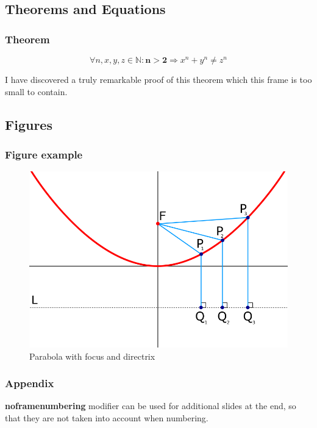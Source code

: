 \documentclass[aspectratio=169]{beamer}
\begin{document}
\subsection{Theorems and Equations}


\begin{frame}
\frametitle{Theorem}
\begin{theorem}
\begin{equation}
    \forall n, x, y, z \in \mathbb{N}: \mathbf{n > 2} \Rightarrow x^n + y^n \neq z^n
\end{equation}
\end{theorem}
I have discovered a truly remarkable proof of this theorem which this frame is too small to contain.
\end{frame}


\subsection{Figures}

\begin{frame}
\frametitle{Figure example}
\begin{figure}
    \includegraphics[scale=.3]{fig/parabola.png}
    \caption{Parabola with focus and directrix}
\end{figure}
\end{frame}


\begin{frame}[plain]
\end{frame}


\begin{frame}[noframenumbering]
\frametitle{Appendix}
    \large
    \textbf{noframenumbering} modifier can be used for additional slides at the end,  so that they are not taken into account when numbering.
\end{frame}
\end{document}
